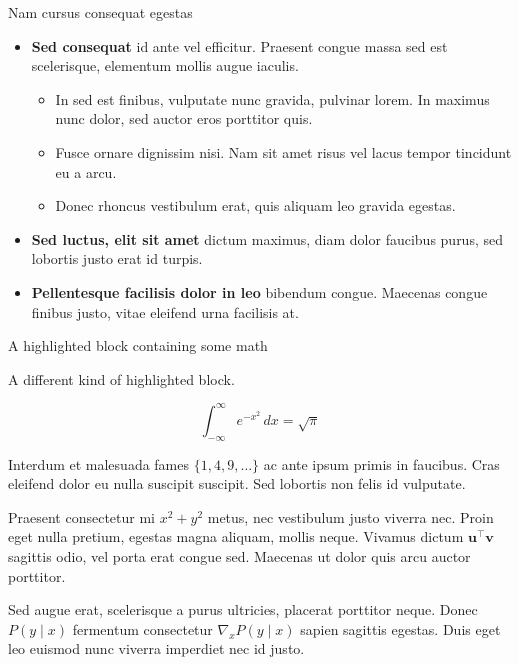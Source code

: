 \documentclass[final]{beamer}
\newlength{\colwidth}
\begin{document}
\begin{frame}[t]
\begin{columns}[t]
\begin{column}{\colwidth}
\begin{block}{Nam cursus consequat egestas}
    \begin{itemize}
      \item \textbf{Sed consequat} id ante vel efficitur. Praesent congue massa
        sed est scelerisque, elementum mollis augue iaculis.
        \begin{itemize}
          \item In sed est finibus, vulputate
            nunc gravida, pulvinar lorem. In maximus nunc dolor, sed auctor eros
            porttitor quis.
          \item Fusce ornare dignissim nisi. Nam sit amet risus vel lacus
            tempor tincidunt eu a arcu.
          \item Donec rhoncus vestibulum erat, quis aliquam leo
            gravida egestas.
        \end{itemize}
      \item \textbf{Sed luctus, elit sit amet} dictum maximus, diam dolor
        faucibus purus, sed lobortis justo erat id turpis.
      \item \textbf{Pellentesque facilisis dolor in leo} bibendum congue.
        Maecenas congue finibus justo, vitae eleifend urna facilisis at.
    \end{itemize}

  \end{block}

  
  \begin{exampleblock}{A highlighted block containing some math}

    A different kind of highlighted block.

    $$
    \int_{-\infty}^{\infty} e^{-x^2}\,dx = \sqrt{\pi}
    $$

    Interdum et malesuada fames $\{1, 4, 9, \ldots\}$ ac ante ipsum primis in
    faucibus. Cras eleifend dolor eu nulla suscipit suscipit. Sed lobortis non
    felis id vulputate.


    Praesent consectetur mi $x^2 + y^2$ metus, nec vestibulum justo viverra
    nec. Proin eget nulla pretium, egestas magna aliquam, mollis neque. Vivamus
    dictum $\mathbf{u}^\intercal\mathbf{v}$ sagittis odio, vel porta erat
    congue sed. Maecenas ut dolor quis arcu auctor porttitor.


    Sed augue erat, scelerisque a purus ultricies, placerat porttitor neque.
    Donec $P(y \mid x)$ fermentum consectetur $\nabla_x P(y \mid x)$ sapien
    sagittis egestas. Duis eget leo euismod nunc viverra imperdiet nec id
    justo.


\end{exampleblock}
\end{column}
\end{columns}
\end{frame}
\end{document}
